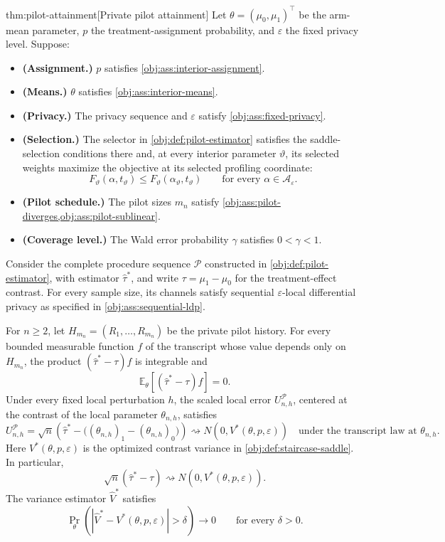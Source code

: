 \begin{theoremv}{thm:pilot-attainment}[Private pilot attainment]
Let \(\theta=(\mu_0,\mu_1)^{\top}\) be the arm-mean parameter, \(p\) the treatment-assignment probability, and \(\varepsilon\) the fixed privacy level. Suppose:
\begin{itemize}
\item \textbf{(Assignment.)} \(p\) satisfies \cref{obj:ass:interior-assignment}.
\item \textbf{(Means.)} \(\theta\) satisfies \cref{obj:ass:interior-means}.
\item \textbf{(Privacy.)} The privacy sequence and \(\varepsilon\) satisfy \cref{obj:ass:fixed-privacy}.
\item \textbf{(Selection.)} The selector in \cref{obj:def:pilot-estimator} satisfies the saddle-selection conditions there and, at every interior parameter \(\vartheta\), its selected weights maximize the objective at its selected profiling coordinate:
\[
F_{\vartheta}(\alpha,t_{\vartheta})
\le F_{\vartheta}(\alpha_{\vartheta},t_{\vartheta})
\qquad
\text{for every }\alpha\in\mathcal A_{\varepsilon}.
\]
\item \textbf{(Pilot schedule.)} The pilot sizes \(m_n\) satisfy \cref{obj:ass:pilot-diverges,obj:ass:pilot-sublinear}.
\item \textbf{(Coverage level.)} The Wald error probability \(\gamma\) satisfies \(0<\gamma<1\).
\end{itemize}

Consider the complete procedure sequence \(\mathcal P\) constructed in \cref{obj:def:pilot-estimator}, with estimator \(\widehat\tau^*\), and write \(\tau=\mu_1-\mu_0\) for the treatment-effect contrast. For every sample size, its channels satisfy sequential \(\varepsilon\)-local differential privacy as specified in \cref{obj:ass:sequential-ldp}.

For \(n\ge2\), let \(H_{m_n}=(R_1,\ldots,R_{m_n})\) be the private pilot history. For every bounded measurable function \(f\) of the transcript whose value depends only on \(H_{m_n}\), the product \((\widehat\tau^*-\tau)f\) is integrable and
\[
\mathbb E_{\theta}\!\left[(\widehat\tau^*-\tau)f\right]=0.
\]
Under every fixed local perturbation \(h\), the scaled local error \(U_{n,h}^{\mathcal P}\), centered at the contrast of the local parameter \(\theta_{n,h}\), satisfies
\[
U_{n,h}^{\mathcal P}
=
\sqrt n\left(
\widehat\tau^*
-
\bigl((\theta_{n,h})_1-(\theta_{n,h})_0\bigr)
\right)
\rightsquigarrow
N\!\left(0,V^*(\theta,p,\varepsilon)\right)
\quad\text{under the transcript law at }\theta_{n,h}.
\]
Here \(V^*(\theta,p,\varepsilon)\) is the optimized contrast variance in \cref{obj:def:staircase-saddle}. In particular,
\[
\sqrt n(\widehat\tau^*-\tau)
\rightsquigarrow N\!\left(0,V^*(\theta,p,\varepsilon)\right).
\]
The variance estimator \(\widehat V^*\) satisfies
\[
\Pr_{\theta}\!\left(
\left|\widehat V^*-V^*(\theta,p,\varepsilon)\right|>\delta
\right)\longrightarrow0
\qquad\text{for every }\delta>0.
\]


\end{theoremv}
